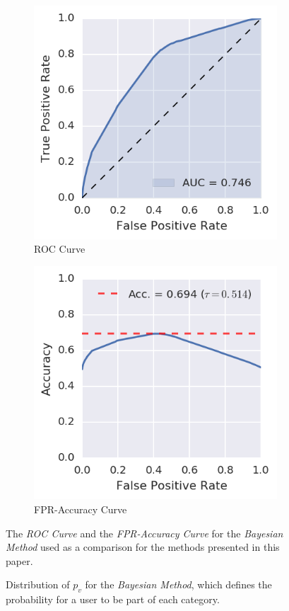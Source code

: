 \begin{figure}
\centering
\begin{subfigure}[t]{.49\columnwidth}
	\centering
	\includegraphics[width=\textwidth]{figures/roc_contacts.png}
	\caption{ROC Curve}
\label{fig:roc_contacts}
\end{subfigure}
\begin{subfigure}[t]{.49\columnwidth}
	\centering
	\includegraphics[width=\textwidth]{figures/accuracy_contacts.png}
	\caption{FPR-Accuracy Curve}
\label{fig:accuracy_contacts}
\end{subfigure}
\caption{The \emph{ROC Curve} and the \emph{FPR-Accuracy Curve} for the \emph{Bayesian Method} used as a comparison for the methods presented in this paper.}
\label{fig:roc_accuracy_contacts}
\end{figure}

\begin{figure}
\centering
{}
\caption{Distribution of $p_v$ for the \emph{Bayesian Method}, which defines the probability for a user to be part of each category.}
\label{fig:hist_contacts}
\end{figure}
